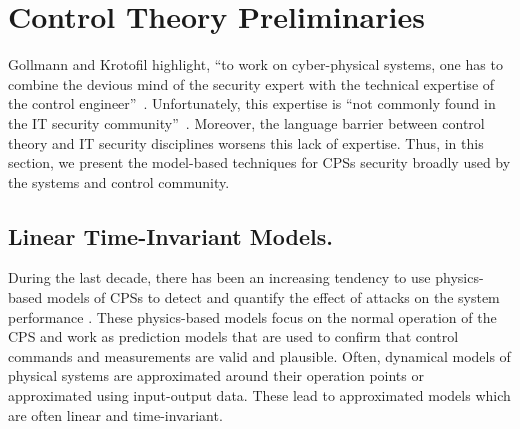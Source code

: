 {
\section{Control Theory Preliminaries}
Gollmann and Krotofil highlight, ``to work on cyber-physical systems, one has to combine the devious mind of the security expert with the technical expertise of the control engineer''~\cite{CPSSec}. 
Unfortunately, this expertise is ``not commonly found in the IT security community''~\cite{CPSSecVinyl}. 
Moreover, the language barrier between control theory and IT security disciplines worsens this lack of expertise.
Thus, in this section, we present the model-based techniques for CPSs security broadly used by the systems and control community.
\subsection{Linear Time-Invariant Models.}
During the last decade, there has been an increasing tendency to use physics-based models of CPSs to detect and quantify the effect of attacks on the system performance \cite{CPSAttacksAgainstPCS,LimitingImpactStealthyAttacks,CPSDetectingIntegrityAttacksScada,CPSIntegrityAttacks,Carlos_Justin1,Carlos_Justin2,Carlos_Justin3}. These physics-based models focus on the normal operation of the CPS and work as prediction models that are used to confirm that control commands and measurements are valid and plausible. Often, dynamical models of physical systems are approximated around their operation points or approximated using input-output data. These lead to approximated models which are often linear and time-invariant.

}
